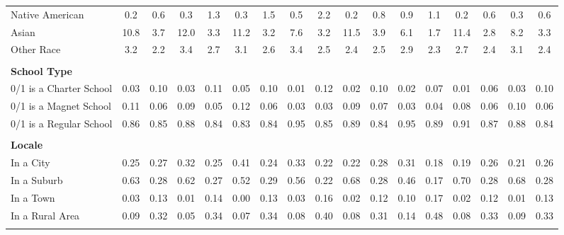 \begin{tabular*}{\linewidth}{@{\extracolsep{\fill} } lcccccccccccccccc}
\hspace{0.2cm}Native American&0.2&0.6&0.3&1.3&0.3&1.5&0.5&2.2&0.2&0.8&0.9&1.1&0.2&0.6&0.3&0.6\\%
\hspace{0.2cm}Asian&10.8&3.7&12.0&3.3&11.2&3.2&7.6&3.2&11.5&3.9&6.1&1.7&11.4&2.8&8.2&3.3\\%
\hspace{0.2cm}Other Race&3.2&2.2&3.4&2.7&3.1&2.6&3.4&2.5&2.4&2.5&2.9&2.3&2.7&2.4&3.1&2.4\\%
&&&&&&&&&&&&&&&&\\%
\multicolumn{17}{l}{\bfseries School Type}\\%
\hspace{0.2cm}0/1 is a Charter School&0.03&0.10&0.03&0.11&0.05&0.10&0.01&0.12&0.02&0.10&0.02&0.07&0.01&0.06&0.03&0.10\\%
\hspace{0.2cm}0/1 is a Magnet School&0.11&0.06&0.09&0.05&0.12&0.06&0.03&0.03&0.09&0.07&0.03&0.04&0.08&0.06&0.10&0.06\\%
\hspace{0.2cm}0/1 is a Regular School&0.86&0.85&0.88&0.84&0.83&0.84&0.95&0.85&0.89&0.84&0.95&0.89&0.91&0.87&0.88&0.84\\%
&&&&&&&&&&&&&&&&\\%
\multicolumn{17}{l}{\bfseries Locale}\\%
\hspace{0.2cm}In a City&0.25&0.27&0.32&0.25&0.41&0.24&0.33&0.22&0.22&0.28&0.31&0.18&0.19&0.26&0.21&0.26\\%
\hspace{0.2cm}In a Suburb&0.63&0.28&0.62&0.27&0.52&0.29&0.56&0.22&0.68&0.28&0.46&0.17&0.70&0.28&0.68&0.28\\%
\hspace{0.2cm}In a Town&0.03&0.13&0.01&0.14&0.00&0.13&0.03&0.16&0.02&0.12&0.10&0.17&0.02&0.12&0.01&0.13\\%
\hspace{0.2cm}In a Rural Area&0.09&0.32&0.05&0.34&0.07&0.34&0.08&0.40&0.08&0.31&0.14&0.48&0.08&0.33&0.09&0.33\\%
&&&&&&&&&&&&&&&&\\%
\hline%
\end{tabular*}